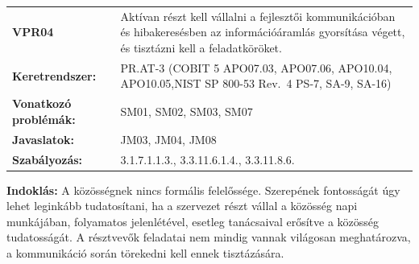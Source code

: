 \documentclass[12pt,magyar,a4paper,oneside]{scrreprt}
\begin{document}
\begin{longtable}[]{@{}ll@{}}
\toprule
\endhead
\begin{minipage}[t]{0.16\columnwidth}\raggedright
\textbf{VPR04}\strut
\end{minipage} & \begin{minipage}[t]{0.79\columnwidth}\raggedright
Aktívan részt kell vállalni a fejlesztői kommunikációban és
hibakeresésben az információáramlás gyorsítása végett, és tisztázni kell
a feladatköröket.\strut
\end{minipage}\tabularnewline
\begin{minipage}[t]{0.16\columnwidth}\raggedright
\textbf{Keretrendszer:}\strut
\end{minipage} & \begin{minipage}[t]{0.79\columnwidth}\raggedright
PR.AT-3 (COBIT 5 APO07.03, APO07.06, APO10.04, APO10.05,NIST SP 800-53
Rev.~4 PS-7, SA-9, SA-16)\strut
\end{minipage}\tabularnewline
\begin{minipage}[t]{0.16\columnwidth}\raggedright
\textbf{Vonatkozó problémák:}\strut
\end{minipage} & \begin{minipage}[t]{0.79\columnwidth}\raggedright
SM01, SM02, SM03, SM07\strut
\end{minipage}\tabularnewline
\begin{minipage}[t]{0.16\columnwidth}\raggedright
\textbf{Javaslatok:}\strut
\end{minipage} & \begin{minipage}[t]{0.79\columnwidth}\raggedright
JM03, JM04, JM08\strut
\end{minipage}\tabularnewline
\begin{minipage}[t]{0.16\columnwidth}\raggedright
\textbf{Szabályozás:}\strut
\end{minipage} & \begin{minipage}[t]{0.79\columnwidth}\raggedright
3.1.7.1.1.3., 3.3.11.6.1.4., 3.3.11.8.6.\strut
\end{minipage}\tabularnewline
\bottomrule
\end{longtable}

\textbf{Indoklás: } A közösségnek nincs formális felelőssége. Szerepének
fontosságát úgy lehet leginkább tudatosítani, ha a szervezet részt
vállal a közösség napi munkájában, folyamatos jelenlétével, esetleg
tanácsaival erősítve a közösség tudatosságát. A résztvevők feladatai nem
mindig vannak világosan meghatározva, a kommunikáció során törekedni
kell ennek tisztázására.
\end{document}
